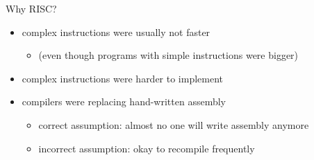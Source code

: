 \begin{frame}[label=RISCwhy]{Why RISC?}
    \begin{itemize}
        \item complex instructions were usually not faster
            \begin{itemize}
            \item (even though programs with simple instructions were bigger)
            \end{itemize}
        \item complex instructions were harder to implement
        \item compilers were replacing hand-written assembly
            \begin{itemize}
            \item correct assumption: almost no one will write assembly anymore
            \item incorrect assumption: okay to recompile frequently
            \end{itemize}
    \end{itemize}
\end{frame}
